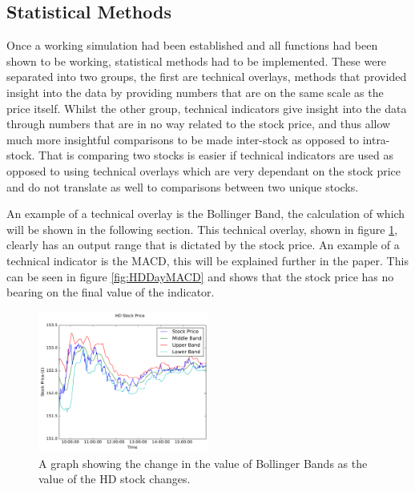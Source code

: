 \documentclass[conference]{IEEEtran}
\begin{document}

\subsection{Statistical Methods}

Once a working simulation had been established and all functions had been shown to be working, statistical methods had to be implemented. These were separated into two groups, the first are technical overlays, methods that provided insight into the data by providing numbers that are on the same scale as the price itself. Whilst the other group, technical indicators give insight into the data through numbers that are in no way related to the stock price, and thus allow much more insightful comparisons to be made inter-stock as opposed to intra-stock. That is comparing two stocks is easier if technical indicators are used as opposed to using technical overlays which are very dependant on the stock price and do not translate as well to comparisons between two unique stocks. 

An example of a technical overlay is the Bollinger Band, the calculation of which will be shown in the following section. This technical overlay, shown in figure \ref{fig:HDDayBollinger}, clearly has an output range that is dictated by the stock price. An example of a technical indicator is the MACD, this will be explained further in the paper. This can be seen in figure \ref{fig:HDDayMACD} and shows that the stock price has no bearing on the final value of the indicator.

\begin{figure}
\includegraphics[width=0.5\textwidth, angle=0]{HDDayBollinger.pdf}
\caption{A graph showing the change in the value of Bollinger Bands as the value of the HD stock changes.}
\label{fig:HDDayBollinger}
\end{figure}
\end{document}
